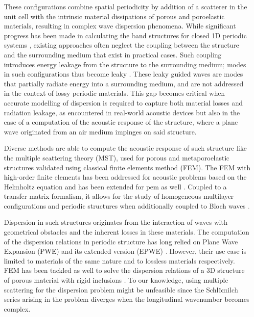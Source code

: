These configurations combine spatial periodicity by addition of a scatterer in the unit cell with the intrinsic material dissipations of porous and poroelastic materials, resulting in complex wave dispersion phenomena. While significant progress has been made in calculating the band structures for closed 1D periodic systems \cite{laude2009, magliacano2020}, existing approaches often neglect the coupling between the structure and the surrounding medium that exist in practical cases. Such coupling introduces energy leakage from the structure to the surrounding medium; modes in such configurations thus become leaky \cite{marcuvitz1956, goldstone1959}. These leaky guided waves are modes that partially radiate energy into a surrounding medium, and are not addressed in the context of lossy periodic materials. This gap becomes critical when accurate modelling of dispersion is required to capture both material losses and radiation leakage, as encountered in real-world acoustic devices but also in the case of a computation of the acoustic response of the structure, where a plane wave originated from an air medium impinges on said structure.

Diverse methods are able to compute the acoustic response of such structure like the multiple scattering theory (MST), used for porous \cite{groby2011} and metaporoelastic \cite{weisser2016} structures validated using classical finite elements method (FEM). The FEM with high-order finite elements  has been addressed for acoustic problems based on the Helmholtz equation \cite{beriot2016,lieu2016} and has been extended for \acrshort{pem} as well \cite{jonckheere2022}. Coupled to a transfer matrix formalism, it allows for the study of homogeneous multilayer configurations \cite{chevillotte2011, alimonti2015} and periodic structures when additionally coupled to Bloch waves \cite{gaborit2018}.

Dispersion in such structures originates from the interaction of waves with geometrical obstacles and the inherent losses in these materials. The computation of the dispersion relations in periodic structure has long relied on Plane Wave Expansion (PWE) and its extended version (EPWE) \cite{romero-garcia2010, laude2009}. However, their use case is limited to materials of the same nature and to lossless materials respectively. FEM has been tackled as well to solve the dispersion relations of a 3D structure of porous material with rigid inclusions \cite{magliacano2020}. To our knowledge, using multiple scattering for the dispersion problem might be unfeasible since the Schlömilch series arising in the problem \cite{groby2011, weisser2016} diverges when the longitudinal wavenumber becomes complex.

